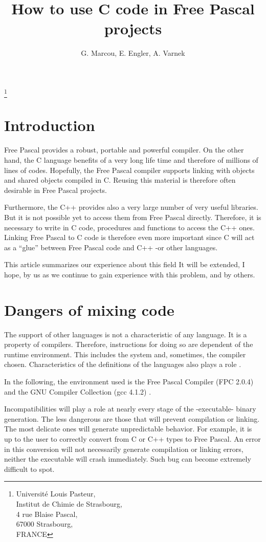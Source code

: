 \documentclass[A4paper]{article}
\title{How to use C code in Free Pascal projects}
\author{G. Marcou, E. Engler, A. Varnek}
\begin{document}
\maketitle\footnote{Universit\'e Louis Pasteur,\\ Institut de Chimie de Strasbourg,\\ 4 rue Blaise Pascal,\\ 67000 Strasbourg,\\ FRANCE}

\section{Introduction}

Free Pascal provides a robust, portable and powerful compiler\cite{FPDoc}. On
the other hand, the C language benefits of a very long life time and
therefore of millions of lines of codes. Hopefully, the Free Pascal
compiler supports linking with objects and shared objects compiled in
C. Reusing this material is therefore often desirable in Free Pascal projects.

Furthermore, the C++ provides also a very large number of very useful
libraries. But it is not possible yet to access them from Free Pascal
directly\cite{FPDoc,FPFor}. Therefore, it is necessary to write in C code,
procedures and functions to access the C++ ones. Linking Free Pascal to C code
is therefore even more important since C will act as a ``glue'' between
Free Pascal code and C++ -or other languages.

This article summarizes our experience about this field
It will be extended, I hope, by us as we continue to gain
experience with this problem, and by others.

\section{Dangers of mixing code}

The support of other languages is not a characteristic of any
language. It is a property of compilers. Therefore, instructions for
doing so are dependent of the runtime environment. This includes the system
and, sometimes, the compiler chosen. Characteristics of the definitions of the
languages also plays a role \cite{C++}.

In the following, the environment used is the Free Pascal Compiler (FPC
2.0.4) \cite{FPDoc} and the GNU Compiler Collection (gcc 4.1.2) \cite{gcc}.

Incompatibilities will play a role at nearly every stage of the -executable-
binary generation. The less dangerous are those that will prevent compilation
or linking. The most delicate ones will generate unpredictable behavior. For
example, it is up to the user to correctly convert from C or C++ types to Free
Pascal. An error in this conversion will not necessarily generate compilation
or linking errors, neither the executable will crash immediately. Such bug can
become extremely difficult to spot.
\end{document}
